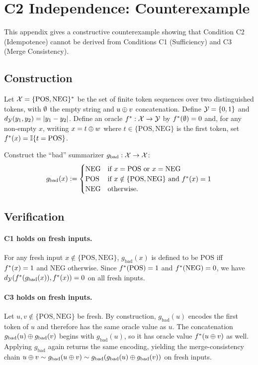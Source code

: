 \section{C2 Independence: Counterexample}\label{app:counterexample}

This appendix gives a constructive counterexample showing that Condition C2 (Idempotence) cannot be derived from Conditions C1 (Sufficiency) and C3 (Merge Consistency).

\subsection{Construction}

Let $\mathcal{X} = \{\text{POS}, \text{NEG}\}^\ast$ be the set of finite token sequences over two distinguished tokens, with $\emptyset$ the empty string and $u \oplus v$ concatenation.
Define $\mathcal{Y} = \{0,1\}$ and $d_{\mathcal{Y}}(y_1,y_2)=|y_1-y_2|$.
Define an oracle $f^\ast:\mathcal{X}\to\mathcal{Y}$ by $f^\ast(\emptyset)=0$ and, for any non-empty $x$, writing $x = t \oplus w$ where $t \in \{\text{POS},\text{NEG}\}$ is the first token, set $f^\ast(x)=\mathbb{I}\{t=\text{POS}\}$.

Construct the ``bad'' summarizer $g_{\mathrm{bad}}:\mathcal{X}\to\mathcal{X}$:
\[
g_{\mathrm{bad}}(x) :=
\begin{cases}
\text{NEG} & \text{if } x=\text{POS} \text{ or } x=\text{NEG} \\
\text{POS} & \text{if } x \notin \{\text{POS},\text{NEG}\} \text{ and } f^\ast(x)=1 \\
\text{NEG} & \text{otherwise.}
\end{cases}
\]

\subsection{Verification}

\paragraph{C1 holds on fresh inputs.}
For any fresh input $x \notin \{\text{POS},\text{NEG}\}$, $g_{\mathrm{bad}}(x)$ is defined to be $\text{POS}$ iff $f^\ast(x)=1$ and $\text{NEG}$ otherwise. Since $f^\ast(\text{POS})=1$ and $f^\ast(\text{NEG})=0$, we have $d_{\mathcal{Y}}(f^\ast(g_{\mathrm{bad}}(x)), f^\ast(x))=0$ on all fresh inputs.

\paragraph{C3 holds on fresh inputs.}
Let $u,v \notin \{\text{POS},\text{NEG}\}$ be fresh. By construction, $g_{\mathrm{bad}}(u)$ encodes the first token of $u$ and therefore has the same oracle value as $u$. The concatenation $g_{\mathrm{bad}}(u)\oplus g_{\mathrm{bad}}(v)$ begins with $g_{\mathrm{bad}}(u)$, so it has oracle value $f^\ast(u\oplus v)$ as well. Applying $g_{\mathrm{bad}}$ again returns the same encoding, yielding the merge-consistency chain $u \oplus v \sim g_{\mathrm{bad}}(u \oplus v) \sim g_{\mathrm{bad}}(g_{\mathrm{bad}}(u) \oplus g_{\mathrm{bad}}(v))$ on fresh inputs.

